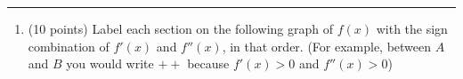 \documentclass[11pt]{article}
\begin{document}
\Large


\medskip\hrule
\vspace{10pt}

\begin{enumerate}

\item (10 points) Label each section on the following graph of $f(x)$ with the sign combination of $f'(x)$ and $f''(x)$, in that order.  (For example,  between $A$ and $B$ you would write $++$ because $f'(x) > 0$ and $f''(x) > 0$)

\begin{center}

\begin{tikzpicture}[x=0.75pt,y=0.75pt,yscale=-1,xscale=1]


\end{tikzpicture}
\end{center}
\end{enumerate}
\end{document}

